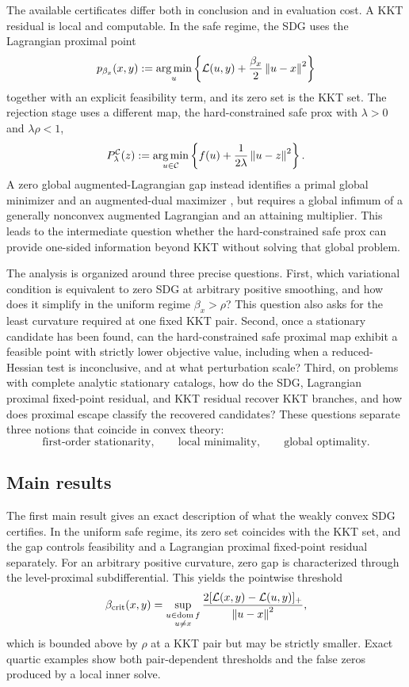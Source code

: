 The available certificates differ both in conclusion and in evaluation cost.
A KKT residual is local and computable.  In the safe regime, the SDG uses the
Lagrangian proximal point
\[
  p_{\beta_x}(x,y)
  :=\operatorname*{arg\,min}_u\left\{\mathcal{L}(u,y)
       +\frac{\beta_x}{2}\left\lVert u-x\right\rVert^2\right\}
\]
together with an explicit feasibility term, and its zero set is the KKT set.
The rejection stage uses a different map, the hard-constrained safe prox
with \(\lambda>0\) and \(\lambda\rho<1\),
\[
  P_\lambda^{\mathcal{C}}(z)
  :=\operatorname*{arg\,min}_{u\in\mathcal{C}}\left\{f(u)
       +\frac{1}{2\lambda}\left\lVert u-z\right\rVert^2\right\}.
\]
A zero global augmented-Lagrangian gap instead identifies a primal global
minimizer and an augmented-dual maximizer
\cite{Rockafellar1974,YalcinKasimbeyli2020}, but requires a global infimum of
a generally nonconvex augmented Lagrangian and an attaining multiplier.  This
leads to the intermediate question whether the hard-constrained safe prox can
provide one-sided information beyond KKT without solving that global problem.

The analysis is organized around three precise questions.  First, which
variational condition is equivalent to zero SDG at arbitrary positive
smoothing, and how does it simplify in the uniform regime
\(\beta_x>\rho\)?  This question also asks for the least curvature required
at one fixed KKT pair.  Second, once a stationary candidate has been found,
can the hard-constrained safe proximal map exhibit a feasible point with
strictly lower objective value, including when a reduced-Hessian test is
inconclusive, and at what perturbation scale?  Third, on problems with
complete analytic stationary catalogs, how do the SDG, Lagrangian proximal
fixed-point residual, and KKT residual recover KKT branches, and how does
proximal escape classify the recovered candidates?  These questions
separate three notions that coincide in convex theory:
\[
  \text{first-order stationarity},\qquad
  \text{local minimality},\qquad
  \text{global optimality}.
\]

\subsection{Main results}
\label{subsec:main-results}

The first main result gives an exact description of what the weakly convex
SDG certifies.  In the uniform safe regime, its zero set coincides with the KKT
set, and the gap controls feasibility and a Lagrangian proximal fixed-point
residual separately.  For an arbitrary positive curvature, zero gap is characterized
through the level-proximal subdifferential.  This yields the pointwise
threshold
\[
  \beta_{\mathrm{crit}}(x,y)
  =
  \sup_{\substack{u\in\operatorname{dom} f\\u\ne x}}
  \frac{2[\mathcal{L}(x,y)-\mathcal{L}(u,y)]_+}{\left\lVert u-x\right\rVert^{2}},
\]
which is bounded above by \(\rho\) at a KKT pair but may be strictly smaller.
Exact quartic examples show both pair-dependent thresholds and the false
zeros produced by a local inner solve.

